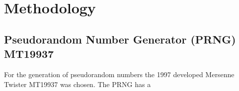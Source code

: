 \section{Methodology}

\subsection{Pseudorandom Number Generator (PRNG) MT19937}\label{ssec:methodology_rng_mt19937}

For the generation of pseudorandom numbers the 1997 developed Mersenne\,Twister MT19937 was chosen.\cite{educativeMersenneTwister}\cite{Makoto_Takuji} The PRNG has a